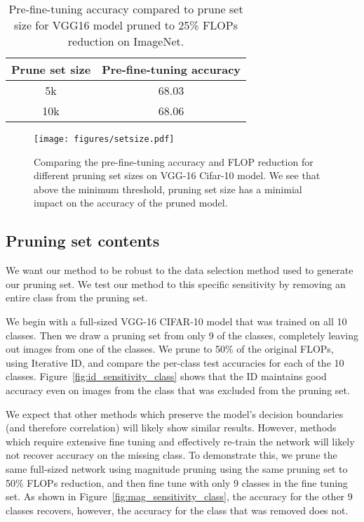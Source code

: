 \begin{table}[]
    \centering
    \begin{tabular}{cc}
        Prune set size & Pre-fine-tuning accuracy \\
        \hline
        5k & 68.03 \\
        10k & 68.06 
    \end{tabular}
    \caption{Pre-fine-tuning accuracy compared to prune set size for VGG16 model pruned to 25\% FLOPs reduction on ImageNet.}
    \label{tab:id_sensitivity_imagenet}
\end{table}

\begin{figure}
\centering
\centering
\texttt{[image: figures/setsize.pdf]}
\caption{
Comparing the pre-fine-tuning accuracy and FLOP reduction for different pruning set sizes on VGG-16 Cifar-10 model.  We see that above the minimum threshold, pruning set size has a minimial impact on the accuracy of the pruned model. 
}
\label{fig:id_sensitivity_cifar10}
\end{figure}

\subsection{Pruning set contents}

We want our method to be robust to the data selection method used to generate our pruning set. 
We test our method to this specific sensitivity by removing an entire class from the pruning set.

We begin with a full-sized VGG-16 CIFAR-10 model that was trained
on all 10 classes.  Then we draw a pruning set from only 9 of the classes, completely leaving out images from one of the classes. We prune to 50\% of the original FLOPs, using Iterative ID, and compare the per-class test accuracies for each of the 10 classes. Figure~\ref{fig:id_sensitivity_class} shows that the ID maintains good accuracy even on images from the class that was excluded from the pruning set.  

We expect that other methods which preserve the model's decision boundaries (and therefore correlation) will likely show similar results.  However, methods which require extensive fine tuning and effectively re-train the network will likely not recover accuracy on the missing class.  To demonstrate this, we prune the same full-sized network using magnitude pruning using the same pruning set to 50\% FLOPs reduction, and then fine tune with only 9 classes in the fine tuning set.  As shown in Figure~\ref{fig:mag_sensitivity_class}, the accuracy for the other 9 classes recovers, however, the accuracy for the class that was removed does not.  

